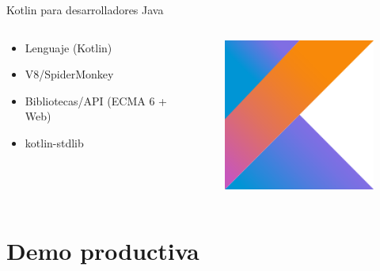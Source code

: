 \documentclass[aspectratio=169]{beamer}
\begin{document}
\begin{frame}[fragile]{Kotlin para desarrolladores Java}
    
    \begin{columns}
        \begin{column}{0.5\textwidth}
            \begin{itemize}
                \item Lenguaje (Kotlin)
                \item V8/SpiderMonkey
                \item Bibliotecas/API (ECMA 6 + Web)
                \item kotlin-stdlib
            \end{itemize}
        \end{column}
        \begin{column}{0.5\textwidth}  %
            \begin{figure}
                \centering
                \includegraphics[width=0.4\linewidth]{Images/kotlin}
            \end{figure}
        \end{column}
    \end{columns}
\end{frame}


{
    \section{Demo productiva}
}
\end{document}
